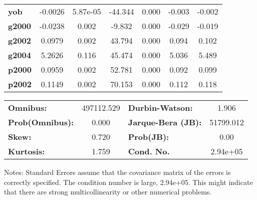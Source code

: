 \begin{center}
\begin{tabular}{lcccccc}
\textbf{yob}                   &      -0.0026  &     5.87e-05     &   -44.344  &         0.000        &       -0.003    &       -0.002     \\
\textbf{g2000}                 &      -0.0238  &        0.002     &    -9.832  &         0.000        &       -0.029    &       -0.019     \\
\textbf{g2002}                 &       0.0979  &        0.002     &    43.794  &         0.000        &        0.094    &        0.102     \\
\textbf{g2004}                 &       5.2626  &        0.116     &    45.474  &         0.000        &        5.036    &        5.489     \\
\textbf{p2000}                 &       0.0959  &        0.002     &    52.781  &         0.000        &        0.092    &        0.099     \\
\textbf{p2002}                 &       0.1149  &        0.002     &    70.153  &         0.000        &        0.112    &        0.118     \\
\bottomrule
\end{tabular}
\begin{tabular}{lclc}
\textbf{Omnibus:}       & 497112.529 & \textbf{  Durbin-Watson:     } &     1.906  \\
\textbf{Prob(Omnibus):} &    0.000   & \textbf{  Jarque-Bera (JB):  } & 51799.012  \\
\textbf{Skew:}          &    0.720   & \textbf{  Prob(JB):          } &      0.00  \\
\textbf{Kurtosis:}      &    1.759   & \textbf{  Cond. No.          } &  2.94e+05  \\
\bottomrule
\end{tabular}
\end{center}

Notes: \newline
 [1] Standard Errors assume that the covariance matrix of the errors is correctly specified. \newline
 [2] The condition number is large, 2.94e+05. This might indicate that there are \newline
 strong multicollinearity or other numerical problems.